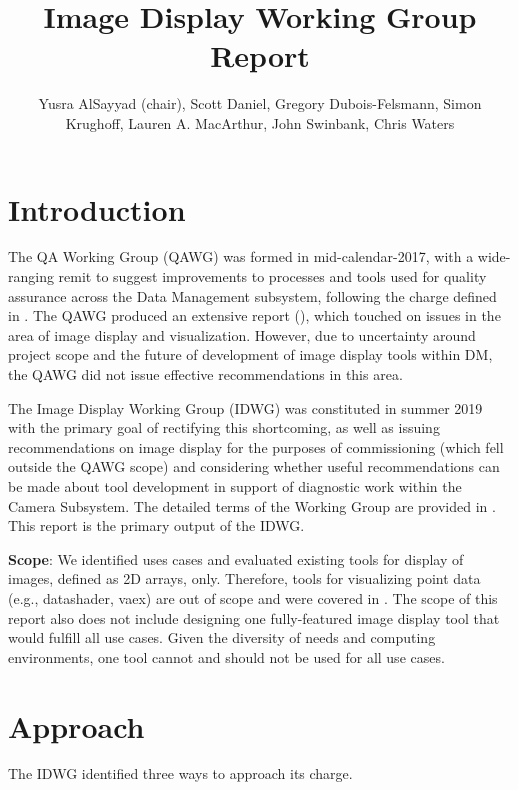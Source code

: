 \documentclass[DM,authoryear,toc]{lsstdoc}
\title{Image Display Working Group Report}
\author{%
Yusra AlSayyad (chair),
Scott Daniel,
Gregory Dubois-Felsmann,
Simon Krughoff,
Lauren A. MacArthur,
John Swinbank,
Chris Waters
}
\date{\vcsDate}
\begin{document}
\maketitle

\section{Introduction}

The QA Working Group (QAWG) was formed in mid-calendar-2017, with a wide-ranging remit to suggest improvements to processes and tools used for quality assurance across the Data Management subsystem, following the charge defined in .
The QAWG produced an extensive report (), which touched on issues in the area of image display and visualization.
However, due to uncertainty around project scope and the future of development of image display tools within DM, the QAWG did not issue effective recommendations in this area.

The Image Display Working Group (IDWG) was constituted in summer 2019 with the primary goal of rectifying this shortcoming, as well as issuing recommendations on image display for the purposes of commissioning (which fell outside the QAWG scope) and considering whether useful recommendations can be made about tool development in support of diagnostic work within the Camera Subsystem.
The detailed terms of the Working Group are provided in .
This report is the primary output of the IDWG.

\textbf{Scope}: We identified uses cases and evaluated existing tools for display of images, defined as 2D arrays, only.
Therefore, tools for visualizing point data (e.g., datashader, vaex) are out of scope and were covered in .
The scope of this report also does not include designing one fully-featured image display tool that would fulfill all use cases.
Given the diversity of needs and computing environments, one tool cannot and should not be used for all use cases.

\section{Approach}

The IDWG identified three ways to approach its charge.
\end{document}
